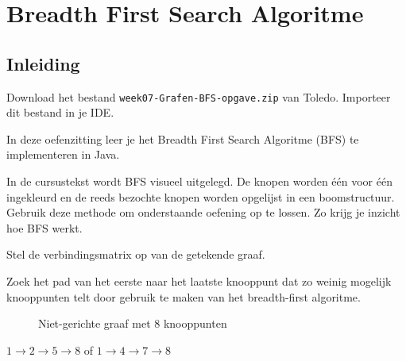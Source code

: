 
\chapter{Breadth First Search Algoritme}
\section*{Inleiding}
Download het bestand \verb/week07-Grafen-BFS-opgave.zip/ van Toledo. Importeer dit bestand in je IDE.

In deze oefenzitting leer je het Breadth First Search Algoritme (BFS) te implementeren in Java. 



\begin{oef}
\papier In de cursustekst wordt BFS visueel uitgelegd. De knopen worden één voor één ingekleurd en de reeds bezochte knopen worden opgelijst in een boomstructuur. Gebruik deze methode om onderstaande oefening op te lossen. Zo krijg je inzicht hoe BFS werkt.
\label{BFS:papier}
\begin{oefenumerate}
\item Stel de verbindingsmatrix op van de getekende graaf.
\item Zoek het  pad van het eerste naar het laatste knooppunt dat zo weinig mogelijk knooppunten telt door gebruik te maken van het breadth-first algoritme.
\end{oefenumerate}
\begin{figure}[htbp]
\begin{center}

\caption{Niet-gerichte graaf met 8 knooppunten}
\label{fig:graaf}
\end{center}
\end{figure}

%
\begin{opl}
$1\rightarrow2\rightarrow5\rightarrow8$ of $1\rightarrow4\rightarrow7\rightarrow8$
\end{opl}

\end{oef}

